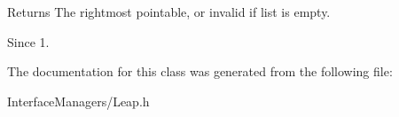 \begin{DoxyReturn}{Returns}
The rightmost pointable, or invalid if list is empty. 
\end{DoxyReturn}
\begin{DoxySince}{Since}
1. 
\end{DoxySince}


The documentation for this class was generated from the following file\+:\begin{DoxyCompactItemize}
\item 
Interface\+Managers/Leap.\+h\end{DoxyCompactItemize}
